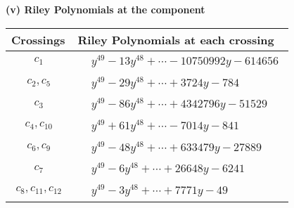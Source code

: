 \documentclass[1p]{elsarticle_modified}
\theoremstyle{definition}
\begin{document}
\flushleft \textbf{(v) Riley Polynomials at the component}\newline \\
\begin{tabular}{m{50pt}|m{274pt}}
Crossings & \hspace{64pt}Riley Polynomials at each crossing \\
\hline $$\begin{aligned}c_{1}\end{aligned}$$&$\begin{aligned}
&y^{49}-13 y^{48}+\cdots-10750992 y-614656
\end{aligned}$\\
\hline $$\begin{aligned}c_{2},c_{5}\end{aligned}$$&$\begin{aligned}
&y^{49}-29 y^{48}+\cdots+3724 y-784
\end{aligned}$\\
\hline $$\begin{aligned}c_{3}\end{aligned}$$&$\begin{aligned}
&y^{49}-86 y^{48}+\cdots+4342796 y-51529
\end{aligned}$\\
\hline $$\begin{aligned}c_{4},c_{10}\end{aligned}$$&$\begin{aligned}
&y^{49}+61 y^{48}+\cdots-7014 y-841
\end{aligned}$\\
\hline $$\begin{aligned}c_{6},c_{9}\end{aligned}$$&$\begin{aligned}
&y^{49}-48 y^{48}+\cdots+633479 y-27889
\end{aligned}$\\
\hline $$\begin{aligned}c_{7}\end{aligned}$$&$\begin{aligned}
&y^{49}-6 y^{48}+\cdots+26648 y-6241
\end{aligned}$\\
\hline $$\begin{aligned}c_{8},c_{11},c_{12}\end{aligned}$$&$\begin{aligned}
&y^{49}-3 y^{48}+\cdots+7771 y-49
\end{aligned}$\\
\hline
\end{tabular}\\~\\
\end{document}
